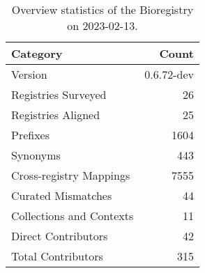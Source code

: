 \begin{table}
\centering
\caption{Overview statistics of the Bioregistry on 2023-02-13.}
\label{tab:bioregistry-summary}
\begin{tabular}{lr}
\toprule
                Category &      Count \\
\midrule
                 Version & 0.6.72-dev \\
     Registries Surveyed &         26 \\
      Registries Aligned &         25 \\
                Prefixes &       1604 \\
                Synonyms &        443 \\
 Cross-registry Mappings &       7555 \\
      Curated Mismatches &         44 \\
Collections and Contexts &         11 \\
     Direct Contributors &         42 \\
      Total Contributors &        315 \\
\bottomrule
\end{tabular}
\end{table}
